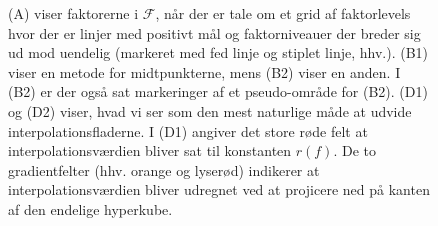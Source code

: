 \documentclass[a4paper, 12pt]{memoir}
\begin{document}
\begin{figure}
\begin{tikzpicture}
\end{tikzpicture}
\caption{(A) viser faktorerne i $\mathcal F$, når der er tale om et grid af faktorlevels hvor der er linjer med positivt mål og faktorniveauer der breder sig ud mod uendelig (markeret med fed linje og stiplet linje, hhv.). (B1) viser en metode for midtpunkterne, mens (B2) viser en anden. I (B2) er der også sat markeringer af et pseudo-område for (B2). (D1) og (D2) viser, hvad vi ser som den mest naturlige måde at udvide interpolationsfladerne. I (D1) angiver det store røde felt at interpolationsværdien bliver sat til konstanten $r(f)$. De to gradientfelter (hhv. orange og lyserød) indikerer at interpolationsværdien bliver udregnet ved at projicere ned på kanten af den endelige hyperkube. 
}\label{hypercubes_placement2}
\end{figure}
\end{document}

